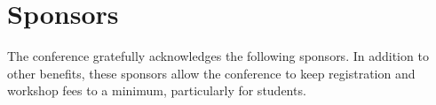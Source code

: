 \chapter{Sponsors}
\thispagestyle{empty} %

\newcommand{\placeSilverSponsorLogo}[1]{
     \raisebox{-0.5\height}{\texttt{[image: local\_img/sponsors/\#1]}}
}

\newcommand{\placeBronzeSponsorLogo}[1]{
     \raisebox{-0.5\height}{\texttt{[image: local\_img/sponsors/\#1]}}
}

\newcommand{\placeSupporterLogo}[1]{
     \raisebox{-0.5\height}{\texttt{[image: local\_img/sponsors/\#1]}}
}

\def \separationwidth {1cm}

\vspace{-3cm} %
\noindent
The conference gratefully acknowledges the following sponsors.  In
addition to other benefits, these sponsors allow the conference to
keep registration and workshop fees to a minimum, particularly for
students.\\

